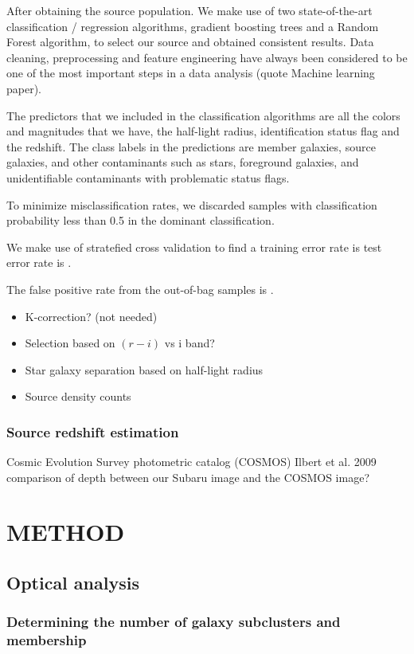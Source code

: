 \documentclass[letterpaper,useAMS,usenatbib]{mn2e}
\begin{document}
After obtaining the source population. 
We make use of two state-of-the-art classification / regression algorithms,
gradient boosting trees and a Random Forest algorithm,
to select our source and obtained consistent results. 
Data cleaning, preprocessing and feature engineering have always been considered to
be one of the most important steps in a data analysis (quote Machine learning
paper). 

The predictors that we included in the classification algorithms are all the
colors and magnitudes that we have, the half-light radius, identification
status flag and the redshift. 
The class labels in the predictions are 
member galaxies, source galaxies, and other contaminants such as stars,
foreground galaxies, and unidentifiable contaminants with problematic status
flags.

To minimize misclassification rates, we discarded samples with classification
probability less than 0.5 in the dominant classification. 

We make use of stratefied cross validation to find a  
training error rate is 
test error rate is .

The false positive rate from the out-of-bag samples is .

\begin{itemize}
	\item K-correction? (not needed)
	\item Selection based on $(r-i)$ vs i band? 
	\item Star galaxy separation based on half-light radius 
	\item Source density counts   
\end{itemize}

\subsubsection{Source redshift estimation}
Cosmic Evolution Survey photometric catalog (COSMOS) 
Ilbert et al. 2009
comparison of depth between our Subaru image and the COSMOS image?

\section{METHOD}

\subsection{Optical analysis}
\subsubsection{Determining the number of galaxy subclusters and membership}
\end{document}
